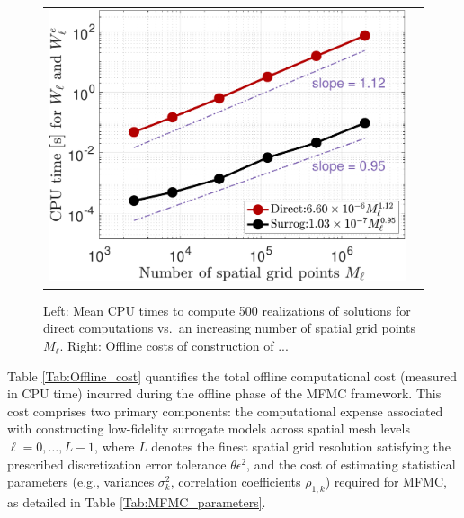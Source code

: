 %
\begin{table}[ht]
\centering
{}
\caption{The number of spatial grid points $M_\ell$, cost per sample for both direct computation $W_\ell$ and surrogate evaluation $W_\ell^e$ at an increasing spatial grid level $\ell = 0$ to 5.}
\label{Tab:Dof}
\end{table}
%

%
\begin{figure}[ht!]\centering
\begin{tabular}{cc}
\includegraphics[width=0.46\linewidth]{./figures/CostPerSample_Ml.pdf}
\end{tabular}
\caption{Left:  Mean CPU times to compute 500 realizations of solutions for direct computations vs.\ an increasing number of spatial grid points $M_\ell$. Right:  Offline costs of construction of ...}
\label{fig:CostEstimatePlot}
\end{figure}
%


 Table \ref{Tab:Offline_cost} quantifies the total offline computational cost (measured in CPU time) incurred during the offline phase of the MFMC framework.  This cost comprises two primary components: the computational expense associated with constructing low-fidelity surrogate models across spatial mesh levels  $\ell = 0, \ldots, L-1$, where $L$ denotes the finest spatial grid resolution satisfying the prescribed discretization error tolerance $\theta\epsilon^2$, and the cost of estimating statistical parameters (e.g., variances $\sigma_k^2$, correlation coefficients $\rho_{1,k}$) required for MFMC, as detailed in Table \ref{Tab:MFMC_parameters}. 
 
